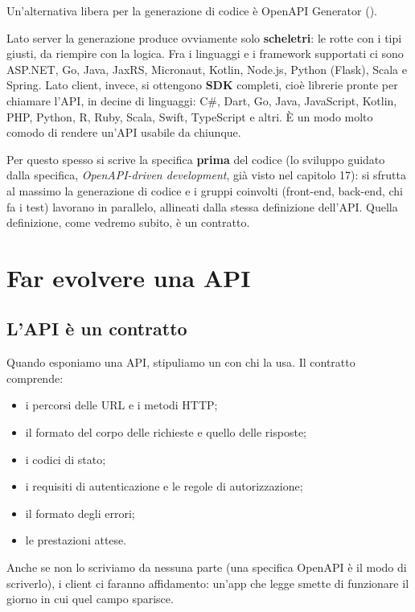 Un'alternativa libera per la generazione di codice è OpenAPI Generator
().

Lato server la generazione produce ovviamente solo \textbf{scheletri}: le
rotte con i tipi giusti, da riempire con la logica. Fra i linguaggi e i
framework supportati ci sono ASP.NET, Go, Java, JaxRS, Micronaut, Kotlin,
Node.js, Python (Flask), Scala e Spring. Lato client, invece, si ottengono
\textbf{SDK} completi, cioè librerie pronte per chiamare l'API, in decine di
linguaggi: C\#, Dart, Go, Java, JavaScript, Kotlin, PHP, Python, R, Ruby, Scala,
Swift, TypeScript e altri. È un modo molto comodo di rendere un'API usabile da
chiunque.

Per questo spesso si scrive la specifica \textbf{prima} del codice (lo sviluppo
guidato dalla specifica, \textit{OpenAPI-driven development}, già visto nel
capitolo 17): si sfrutta al massimo la generazione di codice e i gruppi
coinvolti (front-end, back-end, chi fa i test) lavorano in parallelo, allineati
dalla stessa definizione dell'API. Quella definizione, come vedremo subito, è
un contratto.

\section{Far evolvere una API}

\subsection{L'API è un contratto}

Quando esponiamo una API, stipuliamo un  con chi la usa. Il
contratto comprende:

\begin{itemize}
  \item i percorsi delle URL e i metodi HTTP;
  \item il formato del corpo delle richieste e quello delle risposte;
  \item i codici di stato;
  \item i requisiti di autenticazione e le regole di autorizzazione;
  \item il formato degli errori;
  \item le prestazioni attese.
\end{itemize}

Anche se non lo scriviamo da nessuna parte (una specifica OpenAPI è il modo di
scriverlo), i client ci faranno affidamento: un'app che legge
 smette di funzionare il giorno in cui quel campo sparisce.


